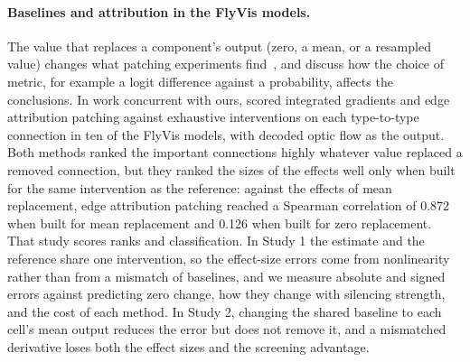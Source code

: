 \paragraph{Baselines and attribution in the FlyVis models.}
The value that replaces a component's output (zero, a mean, or a resampled value) changes what patching experiments find~\citep{heimersheim2024patching,miller2024metrics}, and \citet{heimersheim2024patching} discuss how the choice of metric, for example a logit difference against a probability, affects the conclusions. In work concurrent with ours, \citet{dhawan2026flyhack} scored integrated gradients and edge attribution patching against exhaustive interventions on each type-to-type connection in ten of the FlyVis models, with decoded optic flow as the output. Both methods ranked the important connections highly whatever value replaced a removed connection, but they ranked the sizes of the effects well only when built for the same intervention as the reference: against the effects of mean replacement, edge attribution patching reached a Spearman correlation of 0.872 when built for mean replacement and 0.126 when built for zero replacement. That study scores ranks and classification. In Study 1 the estimate and the reference share one intervention, so the effect-size errors come from nonlinearity rather than from a mismatch of baselines, and we measure absolute and signed errors against predicting zero change, how they change with silencing strength, and the cost of each method. In Study 2, changing the shared baseline to each cell's mean output reduces the error but does not remove it, and a mismatched derivative loses both the effect sizes and the screening advantage.

